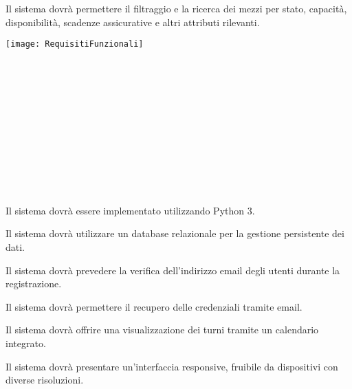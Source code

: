 \documentclass[a4paper]{report}
\begin{document}

Il sistema dovrà permettere il filtraggio e la ricerca dei mezzi per stato, capacità, disponibilità, scadenze assicurative e altri attributi rilevanti.

\begin{figure*}[ht]
    \centering
    \texttt{[image: RequisitiFunzionali]}
\end{figure*}


\vphantom{space}\\ \\ \\ \\ \\ \\ \\ \\ \\ \\



Il sistema dovrà essere implementato utilizzando Python 3.


Il sistema dovrà utilizzare un database relazionale per la gestione persistente dei dati.


Il sistema dovrà prevedere la verifica dell'indirizzo email degli utenti durante la registrazione.


Il sistema dovrà permettere il recupero delle credenziali tramite email.



Il sistema dovrà offrire una visualizzazione dei turni tramite un calendario integrato.


Il sistema dovrà presentare un'interfaccia responsive, fruibile da dispositivi con diverse risoluzioni.

\end{document}
